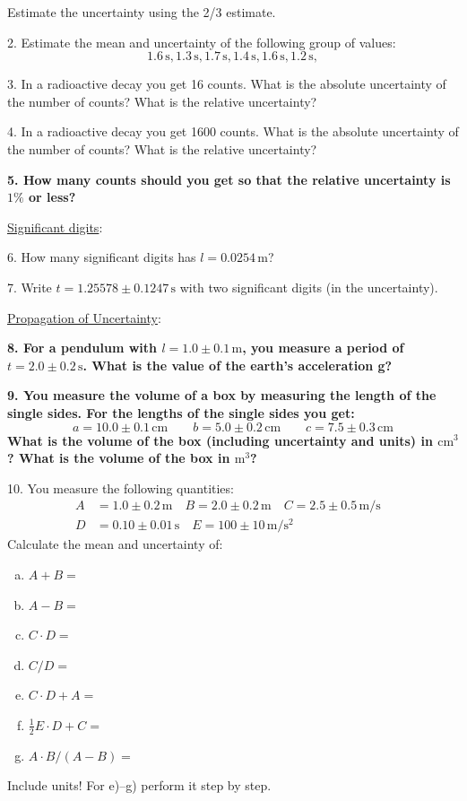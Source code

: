 Estimate the uncertainty using the 2/3 estimate. \myskip

2. Estimate the mean and uncertainty of the following group of values:
\begin{equation*}
    1.6\,\mathrm{s}, 1.3\,\mathrm{s}, 1.7\,\mathrm{s}, 1.4\,\mathrm{s}, 1.6\,\mathrm{s}, 1.2\,\mathrm{s},
\end{equation*}

3. In a radioactive decay you get 16 counts. What is the absolute uncertainty of the number of counts? What is the relative uncertainty? \myskip

4. In a radioactive decay you get 1600 counts. What is the absolute uncertainty of the number of counts? What is the relative uncertainty? \myskip

{\bf{5. How many counts should you get so that the relative uncertainty is $1\%$ or less? }}\myskip

\noindent \underline{Significant digits}: \myskip

6. How many significant digits has $l = 0.0254\,\mathrm{m}$? \myskip

7. Write $t = 1.25578 \pm 0.1247\,\mathrm{s}$ with two significant digits (in the uncertainty). \myskip

\noindent \underline{Propagation of Uncertainty}: \myskip

{\bf{8. For a pendulum with $l = 1.0 \pm 0.1\,\mathrm{m}$, you measure a period of $t = 2.0 \pm 0.2\,\mathrm{s}$. What is the value of the earth's acceleration g?}} \myskip

{\bf{9. You measure the volume of a box by measuring the length of the single sides. For the lengths of the single sides you get:
\begin{equation*}
    a = 10.0 \pm 0.1\,\mathrm{cm}\qquad    b = 5.0 \pm 0.2\,\mathrm{cm} \qquad c = 7.5 \pm 0.3\,\mathrm{cm}
\end{equation*}
What is the volume of the box (including uncertainty and units) in $\mathrm{cm}^3$? What is the volume of the box in $\mathrm{m}^3$? }}\myskip

10. You measure the following quantities:
\begin{align*}
    A &= 1.0 \pm 0.2\,\mathrm{m}\quad B = 2.0 \pm 0.2\,\mathrm{m}\quad        C = 2.5 \pm 0.5\,\mathrm{m/s} \\
    D &= 0.10\pm 0.01\,\mathrm{s}\quad E = 100\pm 10\,\mathrm{m/s^2} &
\end{align*}
Calculate the mean and uncertainty of:
\begin{enumerate}[a)]
    \item $A+B=$
    \item $A-B=$
    \item $C\cdot D=$
    \item $C/D=$
    \item $C\cdot D + A=$
    \item $\frac{1}{2}E\cdot D + C=$
    \item $A\cdot B/(A-B)=$
\end{enumerate}
Include units! For e)--g) perform it step by step.\myskip

